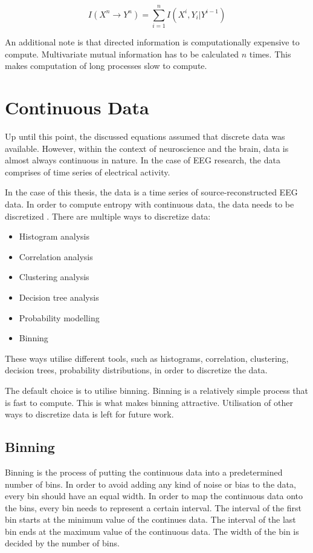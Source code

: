 \begin{equation}
I(X^n \rightarrow Y^n) = \sum^{n}_{i=1}I(X^i, Y_i | Y^{i-1})
\end{equation}

An additional note is that directed information is computationally expensive to compute. Multivariate mutual information has to be calculated $n$ times. This makes computation of long processes slow to compute. 

\section{Continuous Data}\label{binning}
Up until this point, the discussed equations assumed that discrete data was available. However, within the context of neuroscience and the brain, data is almost always continuous in nature. In the case of EEG research, the data comprises of time series of electrical activity.

In the case of this thesis, the data is a time series of source-reconstructed EEG data. In order to compute entropy with continuous data, the data needs to be discretized \cite{ince2017statistical}. There are multiple ways to discretize data:

\begin{itemize}
\item Histogram analysis
\item Correlation analysis
\item Clustering analysis
\item Decision tree analysis
\item Probability modelling
\item Binning
\end{itemize}

These ways utilise different tools, such as histograms, correlation, clustering, decision trees, probability distributions, in order to discretize the data. 

The default choice is to utilise binning. Binning is a relatively simple process that is fast to compute. This is what makes binning attractive. Utilisation of other ways to discretize data is left for future work. 

\subsection{Binning}

Binning is the process of putting the continuous data into a predetermined number of bins. In order to avoid adding any kind of noise or bias to the data, every bin should have an equal width. In order to map the continuous data onto the bins, every bin needs to represent a certain interval. The interval of the first bin starts at the minimum value of the continues data. The interval of the last bin ends at the maximum value of the continuous data. The width of the bin is decided by the number of bins. \cite{ince2017statistical}

